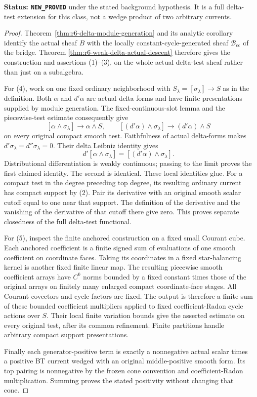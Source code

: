 \documentclass[11pt,a4paper]{article}
\numberwithin{equation}{section}
\theoremstyle{definition}
\theoremstyle{remark}
\begin{document}
\noindent\textbf{Status: \texttt{NEW\_PROVED}} under the
stated background hypothesis. It is a full delta-test
extension for this class, not a wedge product of two
arbitrary currents.

\begin{proof}
Theorem~\ref{thm:r6-delta-module-generation} and its analytic
corollary identify the actual sheaf $B$ with the locally
constant-cycle-generated sheaf $\mathscr B_{\mathrm{cc}}$
of the bridge. Theorem
\ref{thm:r6-weak-delta-actual-descent} therefore gives the
construction and assertions (1)--(3), on the whole actual
delta-test sheaf rather than just on a subalgebra.

For (4), work on one fixed ordinary neighborhood with
$S_\lambda=[\sigma_\lambda]\to S$ as in the definition.
Both $\alpha$ and $d'\alpha$ are actual delta-forms and
have finite presentations supplied by module generation.
The fixed-continuous-slot lemma and the piecewise-test
estimate consequently give
\[
 [\alpha\wedge\sigma_\lambda]\longrightarrow\alpha\wedge S,
 \qquad
 [(d'\alpha)\wedge\sigma_\lambda]
                        \longrightarrow(d'\alpha)\wedge S
\]
on every original compact smooth test. Faithfulness of
actual delta-forms makes $d'\sigma_\lambda=d''\sigma_\lambda=0$.
Their delta Leibniz identity gives
\[
 d'[\alpha\wedge\sigma_\lambda]
                     =[(d'\alpha)\wedge\sigma_\lambda].
\]
Distributional differentiation is weakly continuous;
passing to the limit proves the first claimed identity.
The second is identical. These local identities glue.
For a compact test in the degree preceding top degree,
its resulting ordinary current has compact support by (2).
Pair its derivative with an original smooth scalar cutoff
equal to one near that support. The definition of the
derivative and the vanishing of the derivative of that
cutoff there give zero. This proves separate closedness
of the full delta-test functional.

For (5), inspect the finite anchored construction on a
fixed small Courant cube. Each anchored coefficient is a
finite signed sum of evaluations of one smooth coefficient
on coordinate faces. Taking its coordinates in a fixed
star-balancing kernel is another fixed finite linear map.
The resulting piecewise smooth coefficient arrays have
$C^0$ norms bounded by a fixed constant times those of
the original arrays on finitely many enlarged compact
coordinate-face stages. All Courant covectors and cycle
factors are fixed. The output is therefore a finite sum
of these bounded coefficient multipliers applied to fixed
coefficient-Radon cycle actions over $S$. Their local
finite variation bounds give the asserted estimate on
every original test, after its common refinement. Finite
partitions handle arbitrary compact support presentations.

Finally each generator-positive term is exactly a
nonnegative actual scalar times a positive BT current
wedged with an original middle-positive smooth form.
Its top pairing is nonnegative by the frozen cone
convention and coefficient-Radon multiplication. Summing
proves the stated positivity without changing that cone.
\end{proof}
\end{document}
